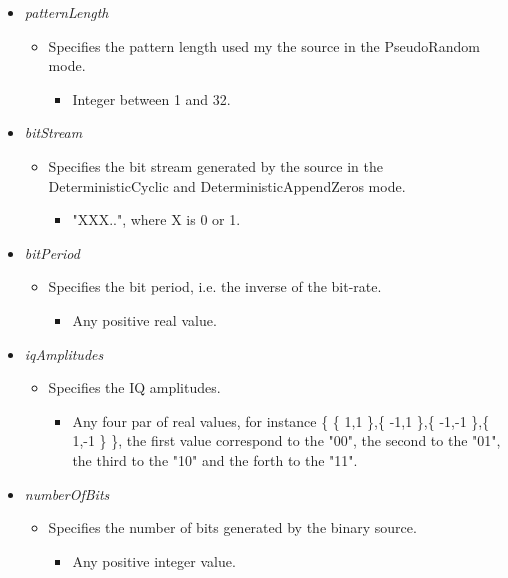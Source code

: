 \begin{refsection}
\begin{itemize}
   \item  \emph{patternLength}
   \begin{itemize}
     \item  Specifies the pattern length used my the source in the PseudoRandom mode.
     \begin{itemize}
       \item  Integer between 1 and 32.
     \end{itemize}
   \end{itemize}

    \item  \emph{bitStream}
   \begin{itemize}
     \item  Specifies the bit stream generated by the source in the DeterministicCyclic and DeterministicAppendZeros mode.
     \begin{itemize}
       \item  "XXX..", where X is 0 or 1.
     \end{itemize}
   \end{itemize}

    \item  \emph{bitPeriod}
   \begin{itemize}
     \item  Specifies the bit period, i.e. the inverse of the bit-rate.
     \begin{itemize}
       \item  Any positive real value.
     \end{itemize}
   \end{itemize}

   \item  \emph{iqAmplitudes}
   \begin{itemize}
     \item  Specifies the IQ amplitudes.
     \begin{itemize}
       \item Any four par of real values, for instance \{ \{ 1,1 \},\{ -1,1 \},\{ -1,-1 \},\{ 1,-1 \} \}, the first value correspond to the "00", the second to the "01", the third to the "10" and the forth to the "11".
     \end{itemize}
   \end{itemize}

   \item  \emph{numberOfBits}
   \begin{itemize}
     \item  Specifies the number of bits generated by the binary source.
     \begin{itemize}
       \item Any positive integer value.
     \end{itemize}
   \end{itemize}


\end{itemize}
\end{refsection}
